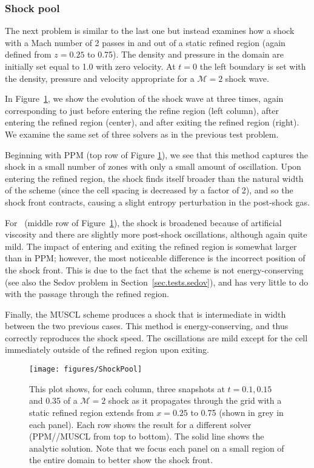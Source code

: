 \subsubsection{Shock pool}
\label{sec.tests.shockpool}

The next problem is similar to the last one but instead examines how a
shock with a Mach number of 2 passes in and out of a static refined
region (again defined from $z=0.25$ to 0.75).  The density and
pressure in the domain are initially set equal to 1.0 with zero
velocity.  At $t=0$ the left boundary is set with the density,
pressure and velocity appropriate for a $\mathcal{M}=2$ shock wave.

In Figure~\ref{fig.shockpool}, we show the evolution of the shock wave
at three times, again corresponding to just before entering the refine
region (left column), after entering the refined region (center), and
after exiting the refined region (right).  We examine the same set of
three solvers as in the previous test problem.

Beginning with PPM (top row of Figure \ref{fig.shockpool}), we see
that this method captures the shock in a small number of zones with
only a small amount of oscillation.  Upon entering the refined region,
the shock finds itself broader than the natural width of the scheme
(since the cell spacing is decreased by a factor of 2), and so the
shock front contracts, causing a slight entropy perturbation in the
post-shock gas.

For \zeus\ (middle row of Figure~\ref{fig.shockpool}), the shock is
broadened because of artificial viscosity and there are slightly more
post-shock oscillations, although again quite mild.  The impact of
entering and exiting the refined region is somewhat larger than in
PPM; however, the most noticeable difference is the incorrect position
of the shock front. This is due to the fact that the scheme is not
energy-conserving (see also the Sedov problem in
Section~\ref{sec.tests.sedov}), and has very little to do with the
passage through the refined region.

Finally, the MUSCL scheme produces a shock that is intermediate in
width between the two previous cases.  This method is
energy-conserving, and thus correctly reproduces the shock speed.  The
oscillations are mild except for the cell immediately outside of the
refined region upon exiting.

\begin{figure}
\begin{center}
\texttt{[image: figures/ShockPool]}
\caption{This plot shows, for each column, three snapshots at $t=0.1,
0.15$ and 0.35 of a $\mathcal{M}=2$ shock as it propagates through the
grid with a static refined region extends from $x = 0.25$ to 0.75
(shown in grey in each panel).  Each row shows the result for a
different solver (PPM/\zeus/MUSCL from top to bottom).  The solid line
shows the analytic solution.  Note that we focus each panel on a small
region of the entire domain to better show the shock front.}
\label{fig.shockpool}
\end{center}
\end{figure}
